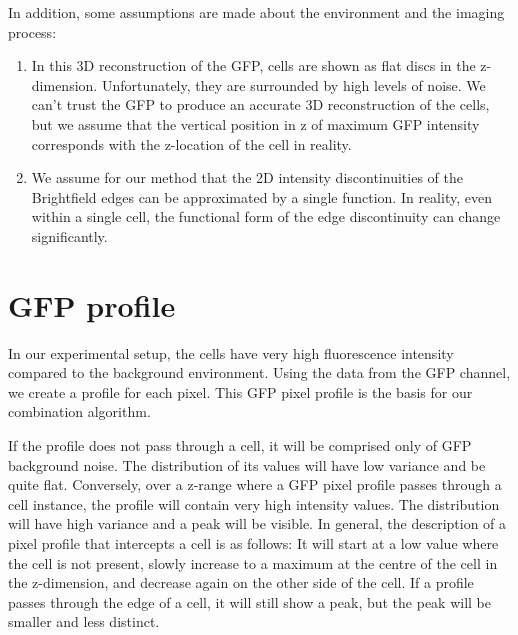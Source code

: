 
In addition, some assumptions are made about the environment and the imaging process:
\begin{enumerate}
\item In this 3D reconstruction of the GFP, cells are shown as flat discs in the z-dimension. Unfortunately, they are surrounded by high levels of noise. We can't trust the GFP to produce an accurate 3D reconstruction of the cells, but we assume that the vertical position in z of maximum GFP intensity corresponds with the z-location of the cell in reality.
\item We assume for our method that the 2D intensity discontinuities of the Brightfield edges can be approximated by a single function. In reality, even within a single cell, the functional form of the edge discontinuity can change significantly.
\end{enumerate}

\section{GFP profile}


In our experimental setup, the cells have very high fluorescence intensity compared to the background environment. Using the data from the GFP channel, we create a profile for each pixel. This GFP pixel profile is the basis for our combination algorithm.

If the profile does not pass through a cell, it will be comprised only of GFP background noise. The distribution of its values will have low variance and be quite flat. Conversely, over a z-range where a GFP pixel profile passes through a cell instance, the profile will contain very high intensity values. The distribution will have high variance and a peak will be visible. In general, the description of a pixel profile that intercepts a cell is as follows: It will start at a low value where the cell is not present, slowly increase to a maximum at the centre of the cell in the z-dimension, and decrease again on the other side of the cell. If a profile passes through the edge of a cell, it will still show a peak, but the peak will be smaller and less distinct.

